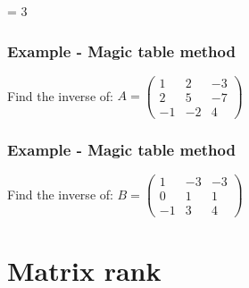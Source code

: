 \documentclass[usenames,dvipsnames,aspectratio=169,10pt]{beamer}
\def \EXAMPLEVERSION {3} %
\numberwithin{equation}{section}
\begin{document}
\ifnum \EXAMPLEVERSION = 3
\begin{frame}
\frametitle{Example - Magic table method}
Find the inverse of: $A = 
\begin{pmatrix}
  1 &  2 & -3 \\
  2 &  5 & -7 \\
 -1 & -2 &  4
\end{pmatrix}$
\vspace{5cm}
\end{frame}

\begin{frame}
\end{frame}


\begin{frame}
\frametitle{Example - Magic table method}
Find the inverse of: $B = 
\begin{pmatrix}
  1 & -3 & -3 \\
  0 &  1 &  1 \\
 -1 &  3 &  4
\end{pmatrix}$
\vspace{5cm}
\end{frame}

\begin{frame}
\end{frame}
\fi 



\section{Matrix rank}
\end{document}
